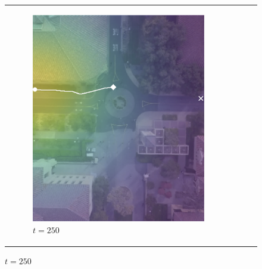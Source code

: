 \documentclass[conference]{IEEEtran}
\begin{document}
\begin{figure}
\begin{tabular}{M{.1\linewidth}  M{.3\linewidth} M{.3\linewidth}  M{.3\linewidth}}
	\begin{subfigure}[b]{\linewidth}  \includegraphics[width=\linewidth]{./figures/comparison/rand_death_1_2_t=250.png}
		\caption{$t=250$}
	\end{subfigure}&

\end{tabular}
\end{figure}
\end{document}
